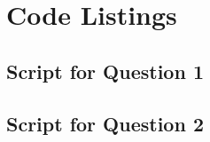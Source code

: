 \pagebreak

\appendix

\section{Code Listings}

\subsection{Script for Question 1}



\pagebreak

\subsection{Script for Question 2}


